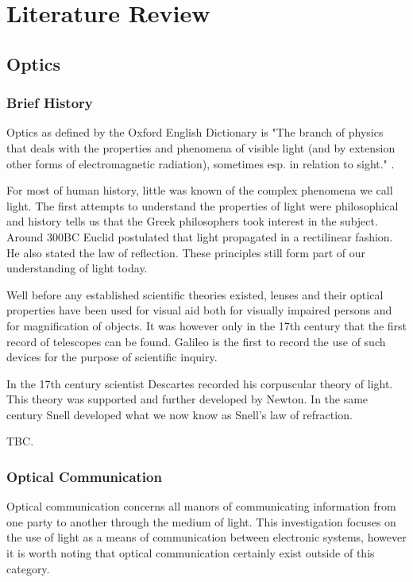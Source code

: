 \chapter{Literature Review}
\label{ch_literature}

\section{Optics}

\subsection{Brief History}
Optics as defined by the Oxford English Dictionary is "The branch of physics that deals with the properties and phenomena of visible light (and by extension other forms of electromagnetic radiation), sometimes esp. in relation to sight." \cite{oed}.

For most of human history, little was known of the complex phenomena we call light. The first attempts to understand the properties of light were philosophical and history tells us that the Greek philosophers took interest in the subject. Around 300BC Euclid postulated that light propagated in a rectilinear fashion. He also stated the law of reflection. These principles still form part of our understanding of light today. \cite{Vohnsen_2004}

Well before any established scientific theories existed, lenses and their optical properties have been used for visual aid both for visually impaired persons and for magnification of objects. It was however only in the 17th century that the first record of telescopes can be found. Galileo is the first to record the use of such devices for the purpose of scientific inquiry.

In the 17th century scientist Descartes recorded his corpuscular theory of light. This theory was supported and further developed by Newton. In the same century Snell developed what we now know as Snell's law of refraction.

TBC.

\subsection{Optical Communication}

Optical communication concerns all manors of communicating information from one party to another through the medium of light. This investigation focuses on the use of light as a means of communication between electronic systems, however it is worth noting that optical communication certainly exist outside of this category.


